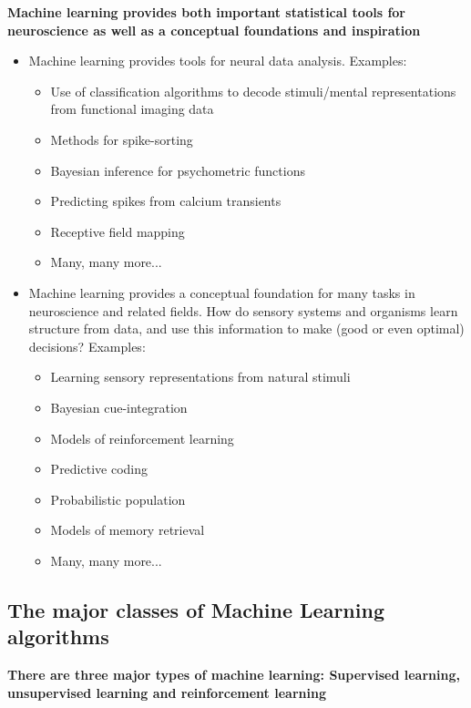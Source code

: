 \textbf{Machine learning provides both important statistical tools for
neuroscience as well as a conceptual foundations and inspiration}

\begin{itemize}
\item  Machine learning provides tools for neural data analysis. Examples:
	\begin{itemize}
	\item Use of classification algorithms to decode stimuli/mental representations from
functional imaging data
	\item Methods for spike-sorting
	\item Bayesian inference for psychometric functions
	\item  Predicting spikes from calcium transients
	\item Receptive field mapping
	\item Many, many more...
	\end{itemize}

\item Machine learning provides a conceptual foundation for many tasks in neuroscience
and related fields. How do sensory systems and organisms learn structure from data,
and use this information to make (good or even optimal) decisions? Examples:
	\begin{itemize}
	\item Learning sensory representations from natural stimuli
	\item Bayesian cue-integration
	\item Models of reinforcement learning
	\item Predictive coding
	\item Probabilistic population
	\item Models of memory retrieval
	\item Many, many more...
	\end{itemize}
\end{itemize}

\subsection{The major classes of Machine Learning algorithms}
\textbf{There are three major types of machine learning:
Supervised learning, unsupervised learning and reinforcement learning}\\

